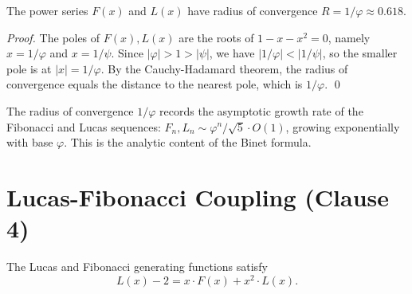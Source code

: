 \begin{theorem}
\label{thm:05-radius}
The power series $F(x)$ and $L(x)$ have radius of convergence
$R = 1/\varphi \approx 0.618$.
\end{theorem}

\begin{proof}
The poles of $F(x), L(x)$ are the roots of $1 - x - x^2 = 0$, namely
$x = 1/\varphi$ and $x = 1/\psi$. Since $|\varphi| > 1 > |\psi|$, we
have $|1/\varphi| < |1/\psi|$, so the smaller pole is at
$|x| = 1/\varphi$. By the Cauchy-Hadamard theorem, the radius of
convergence equals the distance to the nearest pole, which is
$1/\varphi$. \qed
\end{proof}

\begin{remark}
The radius of convergence $1/\varphi$ records the asymptotic growth
rate of the Fibonacci and Lucas sequences: $F_n, L_n \sim \varphi^n /
\sqrt{5} \cdot O(1)$, growing exponentially with base $\varphi$. This
is the analytic content of the Binet formula.
\end{remark}

\section{Lucas-Fibonacci Coupling (Clause 4)}
\label{sec:05-coupling}

\begin{theorem}
\label{thm:05-coupling}
The Lucas and Fibonacci generating functions satisfy
\[
  L(x) - 2 = x \cdot F(x) + x^2 \cdot L(x).
\]
\end{theorem}

